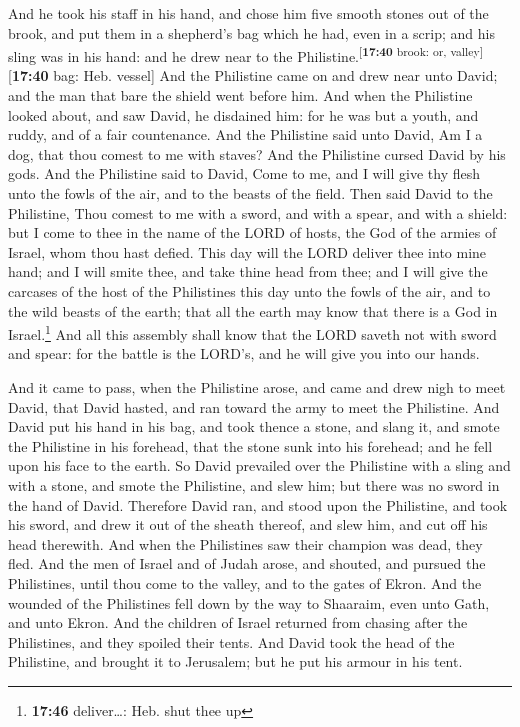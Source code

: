  And he took his staff in his hand, and chose him five
smooth stones out of the brook, and put them in a shepherd's bag which
he had, even in a scrip; and his sling was in his hand: and he drew near
to the Philistine.\textsuperscript{{[}\textbf{17:40} brook: or,
valley{]}}{[}\textbf{17:40} bag: Heb. vessel{]}  And the
Philistine came on and drew near unto David; and the man that bare the
shield went before him.  And when the Philistine looked
about, and saw David, he disdained him: for he was but a youth, and
ruddy, and of a fair countenance.  And the Philistine
said unto David, Am I a dog, that thou comest to me with staves? And the
Philistine cursed David by his gods.  And the Philistine
said to David, Come to me, and I will give thy flesh unto the fowls of
the air, and to the beasts of the field.  Then said David
to the Philistine, Thou comest to me with a sword, and with a spear, and
with a shield: but I come to thee in the name of the LORD of hosts, the
God of the armies of Israel, whom thou hast defied.  This
day will the LORD deliver thee into mine hand; and I will smite thee,
and take thine head from thee; and I will give the carcases of the host
of the Philistines this day unto the fowls of the air, and to the wild
beasts of the earth; that all the earth may know that there is a God in
Israel.\footnote{\textbf{17:46} deliver\ldots: Heb. shut thee up}
 And all this assembly shall know that the LORD saveth
not with sword and spear: for the battle is the LORD's, and he will give
you into our hands.

 And it came to pass, when the Philistine arose, and came
and drew nigh to meet David, that David hasted, and ran toward the army
to meet the Philistine.  And David put his hand in his
bag, and took thence a stone, and slang it, and smote the Philistine in
his forehead, that the stone sunk into his forehead; and he fell upon
his face to the earth.  So David prevailed over the
Philistine with a sling and with a stone, and smote the Philistine, and
slew him; but there was no sword in the hand of David. 
Therefore David ran, and stood upon the Philistine, and took his sword,
and drew it out of the sheath thereof, and slew him, and cut off his
head therewith. And when the Philistines saw their champion was dead,
they fled.  And the men of Israel and of Judah arose, and
shouted, and pursued the Philistines, until thou come to the valley, and
to the gates of Ekron. And the wounded of the Philistines fell down by
the way to Shaaraim, even unto Gath, and unto Ekron.  And
the children of Israel returned from chasing after the Philistines, and
they spoiled their tents.  And David took the head of the
Philistine, and brought it to Jerusalem; but he put his armour in his
tent.


